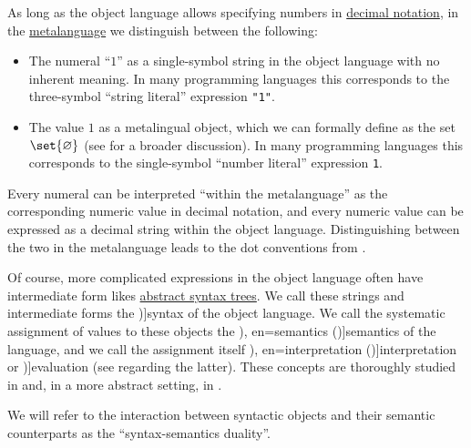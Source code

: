 \begin{concept}\label{con:syntax_semantics_duality}
  As long as the object language allows specifying numbers in \hyperref[def:positional_number_system/decimal]{decimal notation}, in the \hyperref[con:metalanguage]{metalanguage} we distinguish between the following:
  \begin{itemize}
    \item The numeral \enquote{\( 1 \)} as a single-symbol string in the object language with no inherent meaning. In many programming languages this corresponds to the three-symbol \enquote{string literal} expression \texttt{"1"}.

    \item The value \( 1 \) as a metalingual object, which we can formally define as the set \( \set{ \varnothing } \) (see  for a broader discussion). In many programming languages this corresponds to the single-symbol \enquote{number literal} expression \texttt{1}.
  \end{itemize}

  Every numeral can be interpreted \enquote{within the metalanguage} as the corresponding numeric value in decimal notation, and every numeric value can be expressed as a decimal string within the object language. Distinguishing between the two in the metalanguage leads to the dot conventions from .

  Of course, more complicated expressions in the object language often have intermediate form likes \hyperref[con:abstract_syntax_tree]{abstract syntax trees}. We call these strings and intermediate forms the \term[en=syntax (\cite[8]{Hinman2005Logic})]{syntax} of the object language. We call the systematic assignment of values to these objects the \term[ru=семантика (\cite[54]{КолмогоровДрагалин2006Логика}), en=semantics (\cite[8]{Hinman2005Logic})]{semantics} of the language, and we call the assignment itself \term[ru=интерпретация (\cite[17]{Герасимов2011Вычислимость}), en=interpretation (\cite[10]{Smullyan1995FOL})]{interpretation} or \term[ru=оценка (\cite[77]{ШеньВерещагин2017Логика})]{evaluation} (see  regarding the latter). These concepts are thoroughly studied in  and, in a more abstract setting, in .

  We will refer to the interaction between syntactic objects and their semantic counterparts as the \enquote{syntax-semantics duality}.
\end{concept}


